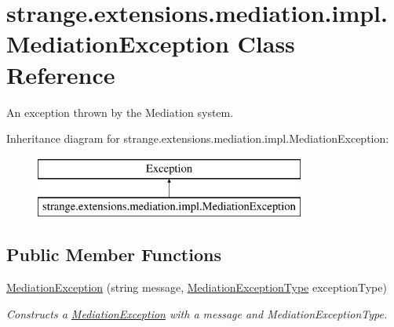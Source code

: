 \hypertarget{classstrange_1_1extensions_1_1mediation_1_1impl_1_1_mediation_exception}{\section{strange.\-extensions.\-mediation.\-impl.\-Mediation\-Exception Class Reference}
\label{classstrange_1_1extensions_1_1mediation_1_1impl_1_1_mediation_exception}
}


An exception thrown by the Mediation system.  


Inheritance diagram for strange.\-extensions.\-mediation.\-impl.\-Mediation\-Exception\-:\begin{figure}[H]
\begin{center}
\leavevmode
\includegraphics[height=2.000000cm]{classstrange_1_1extensions_1_1mediation_1_1impl_1_1_mediation_exception}
\end{center}
\end{figure}
\subsection*{Public Member Functions}
\begin{DoxyCompactItemize}
\item 
\hypertarget{classstrange_1_1extensions_1_1mediation_1_1impl_1_1_mediation_exception_a7adb6956311480480989cd0d1d13eabe}{\hyperlink{classstrange_1_1extensions_1_1mediation_1_1impl_1_1_mediation_exception_a7adb6956311480480989cd0d1d13eabe}{Mediation\-Exception} (string message, \hyperlink{namespacestrange_1_1extensions_1_1mediation_1_1api_aef97993ec02a40c5f887dbfaf4f06e4a}{Mediation\-Exception\-Type} exception\-Type)}\label{classstrange_1_1extensions_1_1mediation_1_1impl_1_1_mediation_exception_a7adb6956311480480989cd0d1d13eabe}

\begin{DoxyCompactList}\small\item\em Constructs a \hyperlink{classstrange_1_1extensions_1_1mediation_1_1impl_1_1_mediation_exception}{Mediation\-Exception} with a message and Mediation\-Exception\-Type. \end{DoxyCompactList}\end{DoxyCompactItemize}
